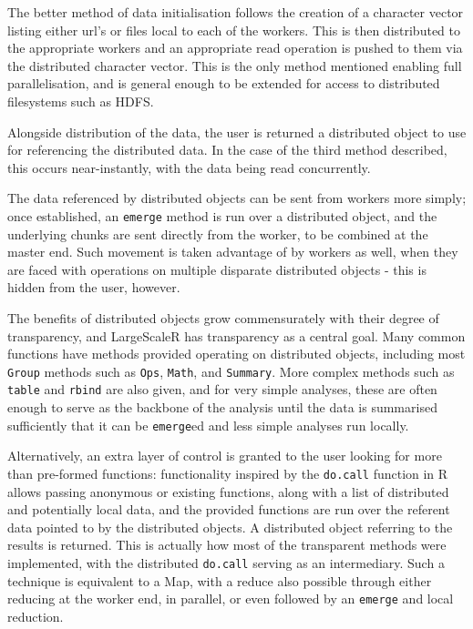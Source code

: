 The better method of data initialisation follows the creation of a character vector listing either url's or files local to each of the workers.
This is then distributed to the appropriate workers and an appropriate read operation is pushed to them via the distributed character vector.
This is the only method mentioned enabling full parallelisation, and is general enough to be extended for access to distributed filesystems such as HDFS.

Alongside distribution of the data, the user is returned a distributed object to use for referencing the distributed data.
In the case of the third method described, this occurs near-instantly, with the data being read concurrently.

The data referenced by distributed objects can be sent from workers more simply; once established, an \texttt{emerge} method is run over a distributed object, and the underlying chunks are sent directly from the worker, to be combined at the master end.
Such movement is taken advantage of by workers as well, when they are faced with operations on multiple disparate distributed objects - this is hidden from the user, however.

The benefits of distributed objects grow commensurately with their degree of transparency, and LargeScaleR has transparency as a central goal.
Many common functions have methods provided operating on distributed objects, including most \texttt{Group} methods such as \texttt{Ops}, \texttt{Math}, and \texttt{Summary}.
More complex methods such as \texttt{table} and \texttt{rbind} are also given, and for very simple analyses, these are often enough to serve as the backbone of the analysis until the data is summarised sufficiently that it can be \texttt{emerge}ed and less simple analyses run locally.

Alternatively, an extra layer of control is granted to the user looking for more than pre-formed functions:
functionality inspired by the \texttt{do.call} function in R allows passing anonymous or existing functions, along with a list of distributed and potentially local data, and the provided functions are run over the referent data pointed to by the distributed objects.
A distributed object referring to the results is returned.
This is actually how most of the transparent methods were implemented, with the distributed \texttt{do.call} serving as an intermediary.
Such a technique is equivalent to a Map, with a reduce also possible through either reducing at the worker end, in parallel, or even followed by an \texttt{emerge} and local reduction.


